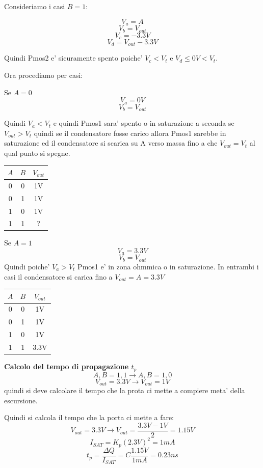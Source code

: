 \documentclass[\main/main.tex]{subfiles}
\begin{document}
Consideriamo i casi $B = 1$:

\[V_a = A \]
\[V_b = V_{out} \]
\[V_c =  - 3.3V\]
\[V_d = V_{out} - 3.3V\]

Quindi Pmos2 e' sicuramente spento poiche' $V_c < V_t$ e $V_d \leq 0V < V_t$.

Ora procediamo per casi:

Se $A = 0$
\[V_a = 0V \]
\[V_b = V_{out} \]

Quindi $V_a < V_t$ e quindi Pmos1 sara' spento o in saturazione a seconda se $V_{out} > V_t$ quindi se il condensatore fosse carico allora Pmos1 sarebbe in saturazione ed il condensatore si scarica su A verso massa fino a che $V_{out} = V_t$ al qual punto si spegne.

\begin{center}
	\begin{tabular}{ c c | c }
		$A$ & $B$ & $V_{out}$ \\
		\hline
		0   & 0   & 1V        \\
		0   & 1   & 1V        \\
		1   & 0   & 1V        \\
		1   & 1   & ?         \\
	\end{tabular}
\end{center}

Se $A = 1$
\[V_a = 3.3V \]
\[V_b = V_{out} \]
Quindi poiche' $V_a > V_t$ Pmos1 e' in zona ohmmica o in saturazione. In entrambi i casi il condensatore si carica fino a $V_{out} = A = 3.3V
$

\begin{center}
	\begin{tabular}{ c c | c }
		$A$ & $B$ & $V_{out}$ \\
		\hline
		0   & 0   & 1V        \\
		0   & 1   & 1V        \\
		1   & 0   & 1V        \\
		1   & 1   & 3.3V      \\
	\end{tabular}
\end{center}

\textbf{Calcolo del tempo di propagazione $t_p$}
\[A,B = 1,1 \longrightarrow A,B = 1,0\]
\[V_{out} = 3.3V \longrightarrow V_{out} = 1V\]
quindi si deve calcolare il tempo che la prota ci mette a compiere meta' della escursione.

Quindi si calcola il tempo che la porta ci mette a fare:
\[V_{out} = 3.3V \longrightarrow V_{out} = \frac{3.3V-1V}{2} = 1.15V\]
\[I_{SAT} = K_p (2.3V)^2 = 1mA\]
\[t_p = \frac{\Delta Q}{I_{SAT}} = C\frac{1.15V}{1mA} = 0.23ns\]
\end{document}
